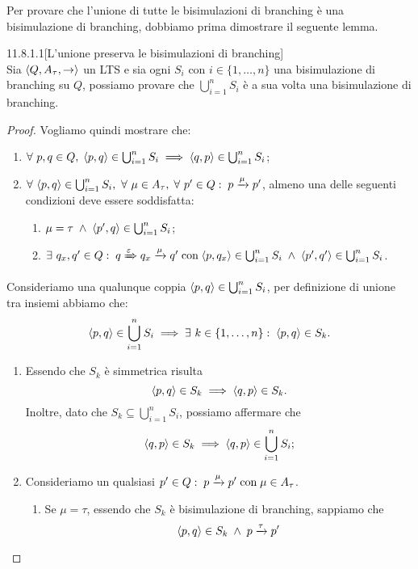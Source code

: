 Per provare che l'unione di tutte le bisimulazioni di branching è una bisimulazione di branching, dobbiamo prima dimostrare il seguente lemma.
\begin{customlemma}{11.8.1.1}[L'unione preserva le bisimulazioni di branching]
\label{lemma:11.8.1.1} \hfill \\
Sia $\langle Q, A_{\tau}, \rightarrow \rangle$ un LTS e sia ogni $S_i$ con $i \in \{1, \ldots, n\}$ una bisimulazione di branching su $Q$, possiamo provare che $\bigcup_{i=1}^{n} S_i$ è a sua volta una bisimulazione di branching.
\end{customlemma}
\begin{proof}
Vogliamo quindi mostrare che:
\begin{enumerate}
\item $\forall\ p,q \in Q ,\; \langle p,q \rangle \in \bigcup_{i=1}^{n} S_i 
\implies \langle q,p \rangle \in \bigcup_{i=1}^{n} S_i$;
\item $\forall\ \langle p,q \rangle \in \bigcup_{i=1}^{n} S_i,\ \forall\ \mu \in A_{\tau} ,\;
\forall\ p' \in Q :\; p \xrightarrow{\mu} p'$, almeno una delle seguenti condizioni deve essere soddisfatta:
\begin{enumerate}
\item $\mu = \tau \; \land \; \langle p', q \rangle \in \bigcup_{i=1}^{n} S_i$;
\item $\exists\ q_x, q' \in Q :\; q \xRightarrow{\varepsilon} q_x \xrightarrow{\mu} q' 
	\; \text{con} \; \langle p, q_x \rangle \in \bigcup_{i=1}^{n} S_i 
	\; \land \; \langle p', q' \rangle \in \bigcup_{i=1}^{n} S_i$.
\end{enumerate}
\end{enumerate}
Consideriamo una qualunque coppia $\langle p,q \rangle \in \bigcup_{i=1}^{n} S_i$, per definizione di unione tra insiemi abbiamo che: \[
	\langle p,q \rangle \in \bigcup_{i=1}^{n} S_i 
	\implies \exists\ k \in \{1, \ldots, n\} :\; \langle p,q \rangle \in S_k.
\]
\begin{enumerate}[leftmargin=*]
\item Essendo che $S_k$ è simmetrica risulta \[
	\langle p,q \rangle \in S_k \implies \langle q,p \rangle \in S_k.
\]
Inoltre, dato che $S_k \subseteq \bigcup_{i=1}^{n} S_i$, possiamo affermare che \[
	\langle q,p \rangle \in S_k \implies \langle q,p \rangle \in \bigcup_{i=1}^{n} S_i;
\]
\item Consideriamo un qualsiasi $p' \in Q :\; p \xrightarrow{\mu} p' \; \text{con} \; \mu \in A_{\tau}$.
\begin{enumerate}
\item Se $\mu = \tau$, essendo che $S_k$ è bisimulazione di branching, sappiamo che \[
	\langle p,q \rangle \in S_k \; \land \; p \xrightarrow{\tau} p'
\]
\end{enumerate}
\end{enumerate}
\end{proof}
